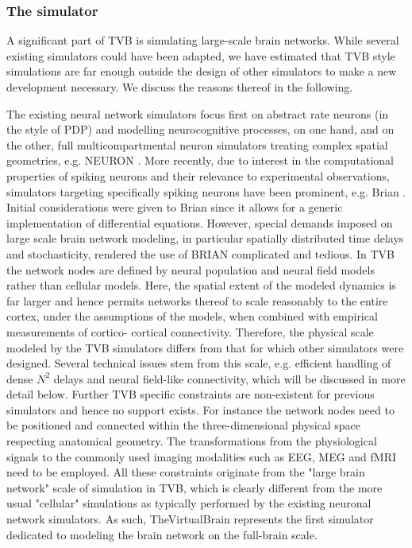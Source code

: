 
\subsubsection{The simulator}

A significant part of TVB is simulating large-scale brain networks. While
several existing simulators could have been adapted, we have estimated that
TVB style simulations are far enough outside the design of other simulators to
make a new development necessary. We discuss the reasons thereof in the following. 

The existing neural network simulators focus first on abstract rate neurons (in
the style of PDP) and modelling neurocognitive processes, on one hand, and on
the other, full multicompartmental neuron simulators treating complex spatial
geometries, e.g. NEURON \cite{Hines_2001}.  More recently, due to interest in
the computational properties of spiking neurons and their relevance to
experimental observations, simulators targeting specifically spiking neurons
have been prominent, e.g. Brian \cite{Goodman_2009}. Initial considerations
were given to  Brian  since it allows for a generic
implementation of differential equations. However, special demands imposed on
large scale brain network modeling, in particular spatially distributed time
delays and stochasticity, rendered the use of BRIAN complicated and tedious.
In TVB the network nodes are defined by neural population and neural field
models \cite{Deco_2008a, Coombes_2010} rather than cellular models. Here, the
spatial extent of the modeled dynamics is far larger and hence permits networks
thereof to scale reasonably to the entire cortex, under the assumptions of the
models, when combined with empirical measurements of cortico- cortical
connectivity. Therefore, the physical scale modeled by the TVB simulators
differs from that for which other simulators were designed.  Several technical
issues stem from this scale, e.g. efficient handling of dense $N^2$ delays and
neural field-like connectivity, which will be discussed in more detail below.
Further TVB specific constraints are non-existent for previous simulators and
hence no support exists. For instance the network nodes need to be positioned
and connected within the three-dimensional physical space respecting anatomical
geometry. The transformations from the physiological signals to the commonly
used imaging modalities such as EEG, MEG and fMRI need to be employed. All
these constraints originate from the "large brain network" scale of simulation
in TVB, which is clearly different from the more usual "cellular" simulations
as typically performed by the existing neuronal network simulators. As such,
TheVirtualBrain represents the first simulator dedicated to modeling the brain
network on the full-brain scale. 

